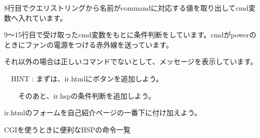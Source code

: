 \bigskip


\bigskip


\bigskip

8行目でクエリストリングから名前がcommandに対応する値を取り出してcmd変数へ入れています。

9〜15行目で受け取ったcmd変数をもとに条件判断をしています。cmdがpowerのときにファンの電源をつける赤外線を送っています。

それ以外の場合は正しいコマンドでないとして、メッセージを表示しています。


\bigskip

\bigskip
{}\theQuestion\label{Q:IR}


\ \ HINT :
まずは、ir.htmlにボタンを追加しよう。

\ \ \ \ そのあと、ir.hspの条件判断を追加しよう。

ir.htmlのフォームを自己紹介ページの一番下に付け加えよう。


\bigskip


\bigskip


\clearpage
\label{P:gpio}
CGIを使うときに便利なHSPの命令一覧



